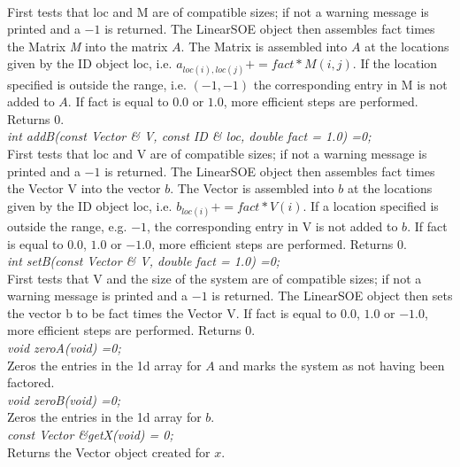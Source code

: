  \\
First tests that \p loc and \p M are of compatible sizes; if not
a warning message is printed and a $-1$ is returned. The LinearSOE
object then assembles \p fact times the Matrix {\em 
M} into the matrix $A$. The Matrix is assembled into $A$ at the
locations given by the ID object \p loc, i.e. $a_{loc(i),loc(j)} +=
fact * M(i,j)$. If the location specified is outside the range,
i.e. $(-1,-1)$ the corresponding entry in \p M is not added to
$A$. If \p fact is equal to $0.0$ or $1.0$, more efficient steps
are performed. Returns $0$.  \\


{\em int addB(const Vector \& V, const ID \& loc,
double fact = 1.0) =0;} \\
First tests that \p loc and \p V are of compatible sizes; if not
a warning message is printed and a $-1$ is returned. The LinearSOE
object then assembles \p fact times the Vector \p V into
the vector $b$. The Vector is assembled into $b$ at the locations
given by the ID object \p loc, i.e. $b_{loc(i)} += fact * V(i)$. If a
location specified is outside the range, e.g. $-1$, the corresponding
entry in \p V is not added to $b$. If \p fact is equal to $0.0$,
$1.0$ or $-1.0$, more efficient steps are performed. Returns $0$. \\


{\em int setB(const Vector \& V, double fact = 1.0) =0;} \\
First tests that \p V and the size of the system are of compatible
sizes; if not a warning message is printed and a $-1$ is returned. The
LinearSOE object then sets the vector \p b to be \p fact times
the Vector \p V. If \p fact is equal to $0.0$, $1.0$ or $-1.0$,
more efficient steps are performed. Returns $0$. \\ 

{\em void zeroA(void) =0;} \\
Zeros the entries in the 1d array for $A$ and marks the system as not
having been factored. \\

{\em void zeroB(void) =0;} \\
Zeros the entries in the 1d array for $b$. \\

{\em const Vector \&getX(void) = 0;} \\
Returns the Vector object created for $x$. \\

